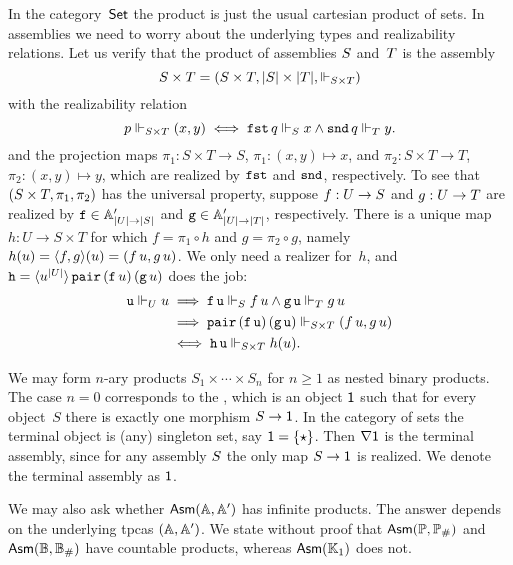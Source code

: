 In the category~$\Set$ the product is just the usual cartesian product
of sets. In assemblies we need to worry about the underlying types and
realizability relations. Let us verify that the product of assemblies
$\asm{S}$ and~$\asm{T}$ is the assembly
%
\begin{equation*}
  \asm{S} \times \asm{T} =
  (S \times T, |S| \times |T|, {\rz[S \times T]})
\end{equation*}
%
with the realizability relation
%
\begin{equation*}
  p \rz[S \times T] (x,y)
  \iff
  \combFst\,q \rz[S] x
  \land
  \combSnd\,q \rz[T] y.
\end{equation*}
%
and the projection maps $\pi_1 : S \times T \to S$, $\pi_1 : (x,y)
\mapsto x$, and $\pi_2 : S \times T \to T$, $\pi_2 : (x,y) \mapsto y$,
which are realized by $\combFst$ and $\combSnd$, respectively.
%
To see that $(\asm{S} \times \asm{T}, \pi_1, \pi_2)$ has the universal
property, suppose $f : \asm{U} \to \asm{S}$ and $g : \asm{U} \to
\asm{T}$ are realized by $\R{f} \in \subAtyp{|U| \to |S|}$ and $\R{g}
\in \subAtyp{|U| \to |T|}$, respectively. There is a unique map $h :
U \to S \times T$ for which $f = \pi_1 \circ h$ and $g = \pi_2 \circ g$,
namely $h(u) = \pair{f,g}(u) = (f\,u, g\,u)$. We only need a realizer
for~$h$, and $\R{h} =
\tpcalam{u}{|U|}{\combPair\,(\R{f}\,u)\,(\R{g}\,u)}$ does the
job:
%
\begin{align*}
  \R{u} \rz[U] u
  &\implies
  \R{f}\,\R{u} \rz[S] f\,u
  \land
  \R{g}\,\R{u} \rz[T] g\,u \\
  &\implies
  \combPair\, (\R{f}\,\R{u})\, (\R{g}\,\R{u}) \rz[S \times T] (f\,u, g\,u) \\
  &\iff
  \R{h}\,\R{u} \rz[S \times T] h(u).
\end{align*}

We may form $n$-ary products $S_1 \times \cdots \times S_n$ for $n \geq 1$ as nested binary products. The case $n = 0$ corresponds to the ,
which is an object $\one$ such that for every object~$S$ there is exactly one morphism $S \to \one$. In the category of sets the terminal object is (any) singleton set, say $\one = \set{\star}$. Then $\nabla \one$ is the terminal assembly, since for any assembly
$\asm{S}$ the only map $S \to \one$ is realized. We denote the terminal assembly as $\one$.

We may also ask whether $\AsmA$ has infinite products. The answer depends on the underlying tpcas $(\AA, \subAA)$. We state without proof that $\Asm{\Scott, \comp{\Scott}}$ and $\Asm{\Baire, \comp{\Baire}}$ have countable products, whereas $\Asm{\klone}$ does not.

